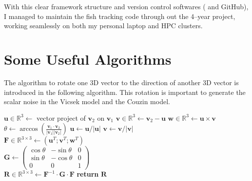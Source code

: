 \documentclass[11pt,twoside]{report}
\begin{document}
\noindent With this clear framework structure and version control softwares ( and GitHub), I managed to maintain the fish tracking code through out the 4--year project, working seamlessly on both my personal laptop and HPC clusters.


\section{Some Useful Algorithms}


The algorithm to rotate one 3D vector to the direction of another 3D vector is introduced in the following algorithm. This rotation is important to generate the scalar noise in the Vicsek model and the Couzin model.

\begin{tcolorbox}[
title=Algorithm to Rotate a 3D vector,
enlarge bottom by=0.5em,
enlarge top by=0.5em,
]

\label{alg:geometry-rotate}
\begin{algorithmic}

 
\State $\mathbf{u} \in \mathbb{R}^3 \gets$ vector project of $\mathbf{v}_2$ on $\mathbf{v}_1$ 
\State $\mathbf{v} \in \mathbb{R}^3 \gets \mathbf{v}_2 - \mathbf{u}$  
\State $\mathbf{w} \in \mathbb{R}^3 \gets \mathbf{u} \times \mathbf{v}$
\State $\theta \gets 
\arccos( \frac{\mathbf{v}_1 \cdot \mathbf{v}_2} { |\mathbf{v}_1| |\mathbf{v}_2|})
$ 
\State $\mathbf{u} \gets \mathbf{u} / |\mathbf{u}|$
\State $\mathbf{v} \gets \mathbf{v} / |\mathbf{v}|$ \\
\State $\mathbf{F} \in \mathbb{R}^{3 \times 3} \gets
(\mathbf{u}^T; \mathbf{v}^T; \mathbf{w}^T)
$  \\
\State $
\mathbf{G} \gets \left(
\begin{matrix}
	\cos \theta & -\sin \theta & 0 \\
	\sin \theta & -\cos \theta & 0 \\
	0 & 0 & 1
\end{matrix}
\right)
$\\
\State $\mathbf{R} \in \mathbb{R}^{3 \times 3} \gets
\mathbf{F}^{-1} \cdot \mathbf{G} \cdot \mathbf{F}
$
\State \textbf{return} $\mathbf{R}$
\EndProcedure
\end{algorithmic}

\end{tcolorbox}
\end{document}
